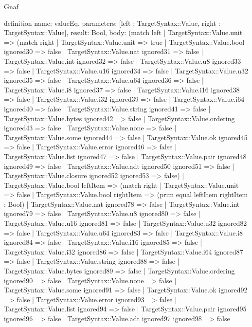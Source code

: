 \begin{lexlean}{Gnaf}
\begin{semanticmodule}
definition{
  name: valueEq,
  parameters: [left : TargetSyntax::Value, right : TargetSyntax::Value],
  result: Bool,
  body: (match left
    | TargetSyntax::Value.unit => (match right
      | TargetSyntax::Value.unit => true
      | TargetSyntax::Value.bool ignored30 => false
      | TargetSyntax::Value.nat ignored31 => false
      | TargetSyntax::Value.int ignored32 => false
      | TargetSyntax::Value.u8 ignored33 => false
      | TargetSyntax::Value.u16 ignored34 => false
      | TargetSyntax::Value.u32 ignored35 => false
      | TargetSyntax::Value.u64 ignored36 => false
      | TargetSyntax::Value.i8 ignored37 => false
      | TargetSyntax::Value.i16 ignored38 => false
      | TargetSyntax::Value.i32 ignored39 => false
      | TargetSyntax::Value.i64 ignored40 => false
      | TargetSyntax::Value.string ignored41 => false
      | TargetSyntax::Value.bytes ignored42 => false
      | TargetSyntax::Value.ordering ignored43 => false
      | TargetSyntax::Value.none => false
      | TargetSyntax::Value.some ignored44 => false
      | TargetSyntax::Value.ok ignored45 => false
      | TargetSyntax::Value.error ignored46 => false
      | TargetSyntax::Value.list ignored47 => false
      | TargetSyntax::Value.pair ignored48 ignored49 => false
      | TargetSyntax::Value.adt ignored50 ignored51 => false
      | TargetSyntax::Value.closure ignored52 ignored53 => false)
    | TargetSyntax::Value.bool leftItem => (match right
      | TargetSyntax::Value.unit => false
      | TargetSyntax::Value.bool rightItem => (prim equal leftItem rightItem : Bool)
      | TargetSyntax::Value.nat ignored78 => false
      | TargetSyntax::Value.int ignored79 => false
      | TargetSyntax::Value.u8 ignored80 => false
      | TargetSyntax::Value.u16 ignored81 => false
      | TargetSyntax::Value.u32 ignored82 => false
      | TargetSyntax::Value.u64 ignored83 => false
      | TargetSyntax::Value.i8 ignored84 => false
      | TargetSyntax::Value.i16 ignored85 => false
      | TargetSyntax::Value.i32 ignored86 => false
      | TargetSyntax::Value.i64 ignored87 => false
      | TargetSyntax::Value.string ignored88 => false
      | TargetSyntax::Value.bytes ignored89 => false
      | TargetSyntax::Value.ordering ignored90 => false
      | TargetSyntax::Value.none => false
      | TargetSyntax::Value.some ignored91 => false
      | TargetSyntax::Value.ok ignored92 => false
      | TargetSyntax::Value.error ignored93 => false
      | TargetSyntax::Value.list ignored94 => false
      | TargetSyntax::Value.pair ignored95 ignored96 => false
      | TargetSyntax::Value.adt ignored97 ignored98 => false
}
\end{semanticmodule}
\end{lexlean}
